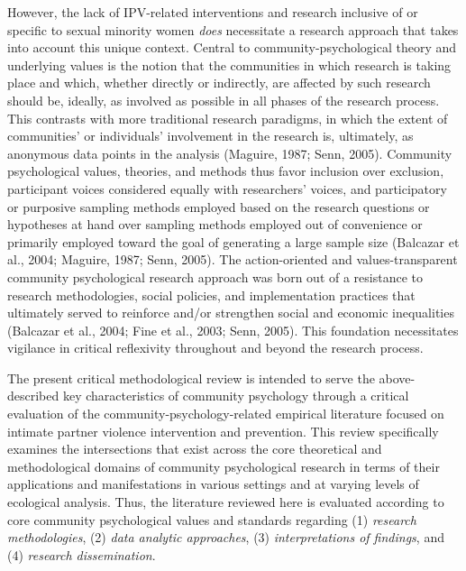 \documentclass[11pt,]{tufte-book}
\begin{document}
However, the lack of IPV-related interventions and research inclusive of
or specific to sexual minority women \emph{does} necessitate a research
approach that takes into account this unique context. Central to
community-psychological theory and underlying values is the notion that
the communities in which research is taking place and which, whether
directly or indirectly, are affected by such research should be,
ideally, as involved as possible in all phases of the research process.
This contrasts with more traditional research paradigms, in which the
extent of communities' or individuals' involvement in the research is,
ultimately, as anonymous data points in the analysis (Maguire, 1987;
Senn, 2005). Community psychological values, theories, and methods thus
favor inclusion over exclusion, participant voices considered equally
with researchers' voices, and participatory or purposive sampling
methods employed based on the research questions or hypotheses at hand
over sampling methods employed out of convenience or primarily employed
toward the goal of generating a large sample size (Balcazar et al.,
2004; Maguire, 1987; Senn, 2005). The action-oriented and
values-transparent community psychological research approach was born
out of a resistance to research methodologies, social policies, and
implementation practices that ultimately served to reinforce and/or
strengthen social and economic inequalities (Balcazar et al., 2004; Fine
et al., 2003; Senn, 2005). This foundation necessitates vigilance in
critical reflexivity throughout and beyond the research process.


The present critical methodological review is intended to serve the
above-described key characteristics of community psychology through a
critical evaluation of the community-psychology-related empirical
literature focused on intimate partner violence intervention and
prevention. This review specifically examines the intersections that
exist across the core theoretical and methodological domains of
community psychological research in terms of their applications and
manifestations in various settings and at varying levels of ecological
analysis. Thus, the literature reviewed here is evaluated according to
core community psychological values and standards regarding (1)
\emph{research methodologies}, (2) \emph{data analytic approaches}, (3)
\emph{interpretations of findings}, and (4) \emph{research
dissemination}.
\end{document}
